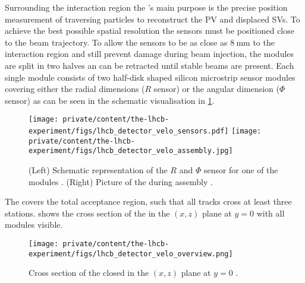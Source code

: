 Surrounding the \protonproton interaction region the \VELO's main purpose is the
precise position measurement of traversing particles to reconstruct the \ac{PV}
and displaced \acp{SV}. To achieve the best possible spatial resolution the
sensors must be positioned close to the beam trajectory. To allow the sensors to
be as close as $\SI{8}{\milli\metre}$ to the interaction region and still
prevent damage during beam injection, the \VELO modules are split in two halves
an can be retracted until stable beams are present. Each single module consists
of two half-disk shaped silicon microstrip sensor modules covering either the
radial dimensions ($R$ sensor) or the angular dimension ($\Phi$ sensor) as can
be seen in the schematic visualisation in
\cref{fig:lhcb_experiment:tracking:velo:sensor}.
%
\begin{figure}[t]
  \texttt{[image: private/content/the-lhcb-experiment/figs/lhcb\_detector\_velo\_sensors.pdf]}
  \texttt{[image: private/content/the-lhcb-experiment/figs/lhcb\_detector\_velo\_assembly.jpg]}
  \caption{(Left) Schematic representation of the $R$ and $\Phi$ sensor for one
  of the \VELO modules \cite{Alves:2008zz}. (Right) Picture of the \VELO during
  assembly \cite{Aaij:1707015}. }
  \label{fig:lhcb_experiment:tracking:velo:sensor}
\end{figure}
%
The \VELO covers the total \LHCb acceptance region, such that all tracks cross
at least three \VELO stations. 
shows the cross section of the \VELO in the $(x,z)$ plane at $y=0$ with all
modules visible. 
%
\begin{figure}[t]
  \texttt{[image: private/content/the-lhcb-experiment/figs/lhcb\_detector\_velo\_overview.png]}
  \caption{
    Cross section of the closed \VELO in the $(x,z)$ plane at $y=0$ \cite{Alves:2008zz}.
  }
  \label{fig:lhcb_experiment:tracking:velo:overview}
\end{figure}

